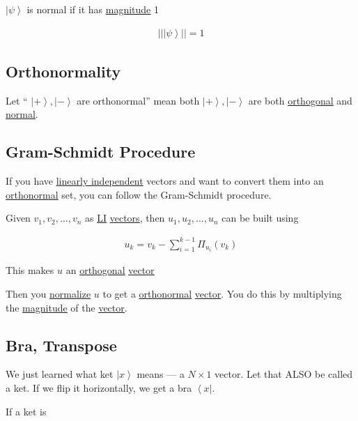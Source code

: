 \documentclass[
]{article}
\let\oldhyperref\hyperref
\renewcommand{\hyperref}[2][]{\oldhyperref[#1]{\underline{#2}}}
\providecommand{\ket}[1]{\left\lvert #1 \right\rangle}
\providecommand{\bra}[1]{\left\langle #1 \right\rvert}
\begin{document}
\(\ket{\psi}\) is normal if it has
\hyperref[magnitude]{magnitude}
1

\begin{gather*}
	||\ket{\psi}||=1
\end{gather*}

\subsection{Orthonormality}\label{orthonormality}

Let `` \(\ket{+},\ket{-}\) are orthonormal'' mean both
\(\ket{+},\ket{-}\) are both
\hyperref[orthogonality]{orthogonal}
and
\hyperref[normal]{normal}.

\subsection{Gram-Schmidt Procedure}\label{gram-schmidt-procedure}

If you have
\hyperref[linear-independence]{linearly
	independent} vectors and want to convert them into an
\hyperref[orthonormality]{orthonormal}
set, you can follow the Gram-Schmidt procedure.

Given \(v_1,v_2,…,v_n\) as
\hyperref[linear-independence]{LI}
\hyperref[vectors]{vectors},
then \(u_1, u_2, …, u_n\) can be built using

\begin{gather*}
	u_k=v_k-\sum_{i=1}^{k-1}\Pi_{u_i}(v_k)
\end{gather*}

This makes \(u\) an
\hyperref[orthogonality]{orthogonal}
\hyperref[vectors]{vector}

Then you
\href{https://www.notion.so/Going-from-1-1-2-to-Understanding-Quantum-Mechanics-344d7c8acbf380088bbdfa6e9ac17c16?pvs=21}{normalize}
\(u\) to get a
\hyperref[orthonormality]{orthonormal}
\hyperref[vectors]{vector}.
You do this by multiplying the
\hyperref[magnitude]{magnitude}
of the
\hyperref[vectors]{vector}.
\subsection{Bra, Transpose}\label{bratranspose}

We just learned what ket \(\ket{x}\) means --- a \(N\times 1\) vector.
Let that ALSO be called a ket. If we flip it horizontally, we get a bra
\(\bra{x}\).

If a ket is
\end{document}
